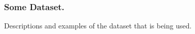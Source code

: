 \subsubsection{Some Dataset.}
\label{sec:3-dataset}

Descriptions and examples of the dataset that is being used.